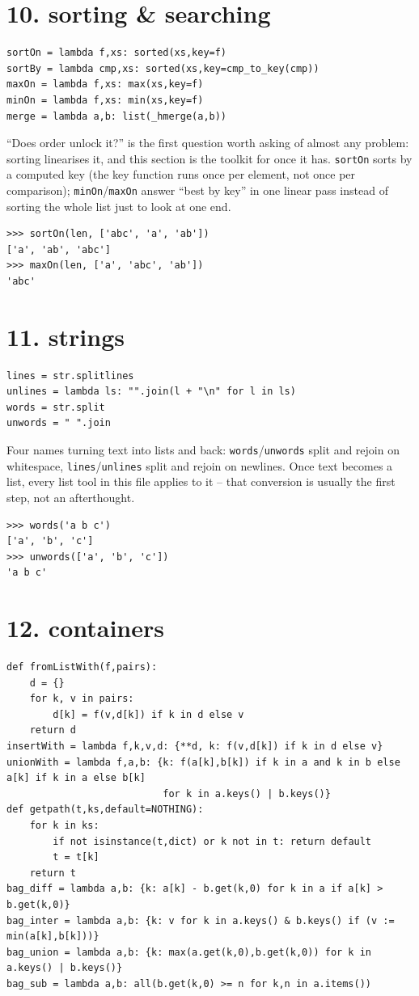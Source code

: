 \documentclass[10pt,letterpaper]{book}
\begin{document}
\section*{10. sorting \& searching}
\begin{lstlisting}[style=code]
sortOn = lambda f,xs: sorted(xs,key=f)
sortBy = lambda cmp,xs: sorted(xs,key=cmp_to_key(cmp))
maxOn = lambda f,xs: max(xs,key=f)
minOn = lambda f,xs: min(xs,key=f)
merge = lambda a,b: list(_hmerge(a,b))
\end{lstlisting}

``Does order unlock it?'' is the first question worth asking of almost any problem: sorting
linearises it, and this section is the toolkit for once it has. \texttt{sortOn} sorts by a computed
key (the key function runs once per element, not once per comparison); \texttt{minOn}/\texttt{maxOn}
answer ``best by key'' in one linear pass instead of sorting the whole list just to look at one end.
\begin{lstlisting}[style=ex]
>>> sortOn(len, ['abc', 'a', 'ab'])
['a', 'ab', 'abc']
>>> maxOn(len, ['a', 'abc', 'ab'])
'abc'
\end{lstlisting}
\section*{11. strings}
\begin{lstlisting}[style=code]
lines = str.splitlines
unlines = lambda ls: "".join(l + "\n" for l in ls)
words = str.split
unwords = " ".join
\end{lstlisting}

Four names turning text into lists and back: \texttt{words}/\texttt{unwords} split and rejoin on
whitespace, \texttt{lines}/\texttt{unlines} split and rejoin on newlines. Once text becomes a list,
every list tool in this file applies to it -- that conversion is usually the first step, not an
afterthought.
\begin{lstlisting}[style=ex]
>>> words('a b c')
['a', 'b', 'c']
>>> unwords(['a', 'b', 'c'])
'a b c'
\end{lstlisting}
\section*{12. containers}
\begin{lstlisting}[style=code]
def fromListWith(f,pairs):
    d = {}
    for k, v in pairs:
        d[k] = f(v,d[k]) if k in d else v
    return d
insertWith = lambda f,k,v,d: {**d, k: f(v,d[k]) if k in d else v}
unionWith = lambda f,a,b: {k: f(a[k],b[k]) if k in a and k in b else a[k] if k in a else b[k]
                           for k in a.keys() | b.keys()}
def getpath(t,ks,default=NOTHING):
    for k in ks:
        if not isinstance(t,dict) or k not in t: return default
        t = t[k]
    return t
bag_diff = lambda a,b: {k: a[k] - b.get(k,0) for k in a if a[k] > b.get(k,0)}
bag_inter = lambda a,b: {k: v for k in a.keys() & b.keys() if (v := min(a[k],b[k]))}
bag_union = lambda a,b: {k: max(a.get(k,0),b.get(k,0)) for k in a.keys() | b.keys()}
bag_sub = lambda a,b: all(b.get(k,0) >= n for k,n in a.items())
\end{lstlisting}
\end{document}
